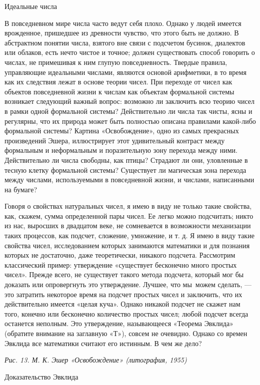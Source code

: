 Идеальные числа

В повседневном мире числа часто ведут себя плохо. Однако у людей имеется врожденное, пришедшее из древности чувство, что этого быть не должно. В абстрактном понятии числа, взятого вне связи с подсчетом бусинок, диалектов или облаков, есть нечто чистое и точное; должен существовать способ говорить о числах, не примешивая к ним глупую повседневность. Твердые правила, управляющие идеальными числами, являются основой арифметики, в то время как их следствия лежат в основе теории чисел. При переходе от чисел как объектов повседневной жизни к числам как объектам формальной системы возникает следующий важный вопрос: возможно ли заключить всю теорию чисел в рамки одной формальной системы? Действительно ли числа так чисты, ясны и регулярны, что их природа может быть полностью описана правилами какой-либо формальной системы? Картина «Освобождение», одно из самых прекрасных произведений Эшера, иллюстрирует этот удивительный контраст между формальным и неформальным и поразительную зону перехода между ними. Действительно ли числа свободны, как птицы? Страдают ли они, уловленные в тесную клетку формальной системы? Существует ли магическая зона перехода между числами, используемыми в повседневной жизни, и числами, написанными на бумаге?

Говоря о свойствах натуральных чисел, я имею в виду не только такие свойства, как, скажем, сумма определенной пары чисел. Ее легко можно подсчитать; никто из нас, выросших в двадцатом веке, не сомневается в возможности механизации таких процессов, как подсчет, сложение, умножение, и т. д. Я имею в виду такие свойства чисел, исследованием которых занимаются математики и для познания которых не достаточно, даже теоретически, никакого подсчета. Рассмотрим классический пример: утверждение «существует бесконечно много простых чисел». Прежде всего, не существует такого метода подсчета, который мог бы доказать или опровергнуть это утверждение. Лучшее, что мы~можем сделать, --- это затратить некоторое время на подсчет простых чисел и заключить, что их действительно имеется «целая куча». Однако никакой подсчет не скажет нам того, конечно или бесконечно количество простых чисел; любой подсчет всегда останется неполным. Это утверждение, называющееся «Теорема Эвклида» (обратите внимание на заглавную «Т»), совсем не очевидно. Однако со времен Эвклида все математики считают его истинным. В чем же дело?

\emph{Рис. 13. М. К. Эшер «Освобождение» (литография, 1955)}

Доказательство Эвклида

